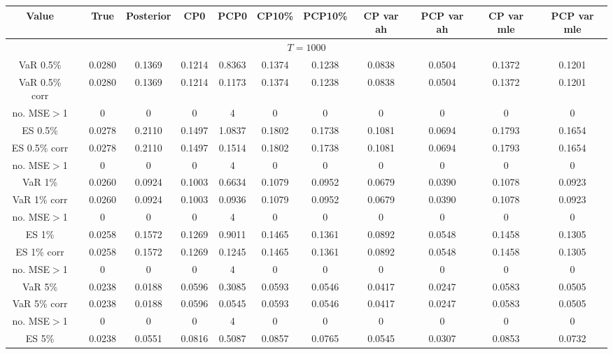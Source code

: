 { \tiny 
{ \renewcommand{\arraystretch}{1.1} 
\begin{sidewaystable} 
\center 
\begin{tabular}{cc cc | cccc | cccc} 
Value && True & Posterior & CP0  & PCP0 & CP10\%  & PCP10\% &CP var ah & PCP var ah & CP var mle & PCP var mle \\ \hline 
\hline 
\multicolumn{12}{c}{$T =1000$}  \\ 
\hline 
VaR 0.5\% && 0.0280 & 0.1369 & 0.1214 & 0.8363 & 0.1374 & 0.1238 &0.0838 & 0.0504 & 0.1372 & 0.1201 \\ 
VaR 0.5\% corr && 0.0280 & 0.1369 & 0.1214 & 0.1173 & 0.1374 & 0.1238 &0.0838 & 0.0504 & 0.1372 & 0.1201 \\ 
no. MSE$>$1 && 0 & 0 & 0 & 4 & 0 & 0 &0 & 0 & 0 & 0 \\[1ex] 
ES 0.5\% && 0.0278 & 0.2110 & 0.1497 & 1.0837 & 0.1802 & 0.1738 &0.1081 & 0.0694 & 0.1793 & 0.1654 \\ 
ES 0.5\% corr && 0.0278 & 0.2110 & 0.1497 & 0.1514 & 0.1802 & 0.1738 &0.1081 & 0.0694 & 0.1793 & 0.1654 \\ 
no. MSE$>$1 && 0 & 0 & 0 & 4 & 0 & 0 &0 & 0 & 0 & 0 \\[1.5ex]  
 \rowcolor{LightCyan} 
VaR 1\% && 0.0260 & 0.0924 & 0.1003 & 0.6634 & 0.1079 & 0.0952 &0.0679 & 0.0390 & 0.1078 & 0.0923 \\  
 \rowcolor{LightCyan} 
VaR 1\% corr && 0.0260 & 0.0924 & 0.1003 & 0.0936 & 0.1079 & 0.0952 &0.0679 & 0.0390 & 0.1078 & 0.0923 \\ 
 \rowcolor{LightCyan} 
no. MSE$>$1 && 0 & 0 & 0 & 4 & 0 & 0 &0 & 0 & 0 & 0 \\[1ex] 
 \rowcolor{LightCyan} 
ES 1\% && 0.0258 & 0.1572 & 0.1269 & 0.9011 & 0.1465 & 0.1361 &0.0892 & 0.0548 & 0.1458 & 0.1305 \\ 
 \rowcolor{LightCyan} 
ES 1\% corr && 0.0258 & 0.1572 & 0.1269 & 0.1245 & 0.1465 & 0.1361 &0.0892 & 0.0548 & 0.1458 & 0.1305 \\ 
 \rowcolor{LightCyan} 
no. MSE$>$1 && 0 & 0 & 0 & 4 & 0 & 0 &0 & 0 & 0 & 0 \\[1.5ex] 
VaR 5\% && 0.0238 & 0.0188 & 0.0596 & 0.3085 & 0.0593 & 0.0546 &0.0417 & 0.0247 & 0.0583 & 0.0505 \\ 
VaR 5\% corr && 0.0238 & 0.0188 & 0.0596 & 0.0545 & 0.0593 & 0.0546 &0.0417 & 0.0247 & 0.0583 & 0.0505 \\ 
no. MSE$>$1 && 0 & 0 & 0 & 4 & 0 & 0 &0 & 0 & 0 & 0 \\[1ex] 
ES 5\% && 0.0238 & 0.0551 & 0.0816 & 0.5087 & 0.0857 & 0.0765 &0.0545 & 0.0307 & 0.0853 & 0.0732 \\ 

\end{tabular}
\end{sidewaystable}}}
